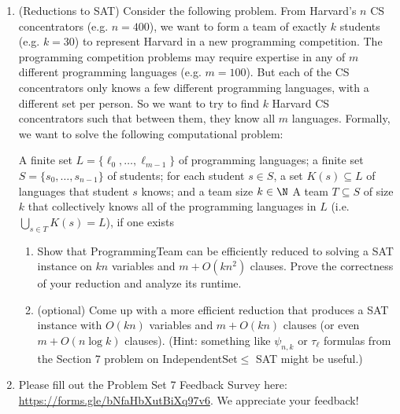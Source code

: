 \documentclass[11pt]{article}
\begin{document}
\begin{enumerate}
\item (Reductions to SAT)  Consider the following problem.  From Harvard's $n$ CS concentrators (e.g. $n=400$), we want to form a team of exactly $k$ students (e.g. $k=30$) to represent Harvard in a new programming competition.  The programming competition problems may require expertise in any of $m$ different programming languages (e.g. $m=100$).  But each of the CS concentrators only knows a few different programming languages, with a different set per person. So we want to try to find $k$ Harvard CS concentrators such that between them, they know all $m$ languages. Formally, we want to solve the following computational problem:

{A finite set $L=\{\ell_0,\ldots,\ell_{m-1}\}$ of programming languages; a finite set 
$S=\{s_0,\ldots,s_{n-1}\}$ of students; for each student $s\in S$, a set $K(s)\subseteq L$ of languages that student $s$ knows; and a team size $k\in \N$}
{A team $T\subseteq S$ of size $k$ that collectively knows all of the programming languages in $L$ (i.e. $\bigcup_{s\in T} K(s)=L$), if one exists}

\begin{enumerate}
    \item 
Show that ProgrammingTeam can be efficiently reduced to solving a SAT instance on $kn$ variables and $m+O(kn^2)$ clauses.  Prove the correctness of your reduction and analyze its runtime.

\item 
(optional\footnotemark[1])
Come up with a more efficient reduction that produces a SAT instance with $O(kn)$ variables and $m+O(kn)$ clauses (or even $m+O(n\log k)$ clauses). (Hint: something like $\psi_{n,k}$ or $\tau_\ell$ formulas from the Section 7 problem on IndependentSet$\leq$ SAT might be useful.)
\end{enumerate}

 \item Please fill out the Problem Set 7 Feedback Survey here: \href{https://forms.gle/bNfaHbXutBiXq97v6}{https://forms.gle/bNfaHbXutBiXq97v6}. We appreciate your feedback!

\end{enumerate}
\end{document}
